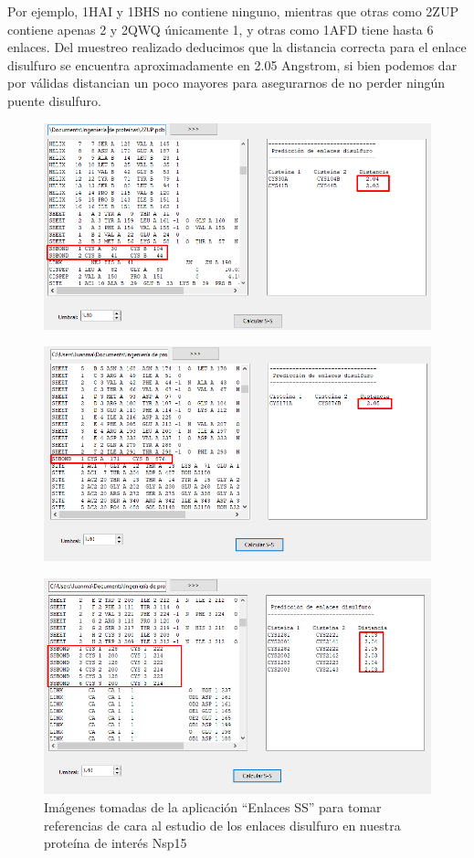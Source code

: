 \documentclass[12pt]{article}
\begin{document}
Por ejemplo, 1HAI y 1BHS no contiene ninguno, mientras que otras como 2ZUP contiene apenas 2 y 2QWQ únicamente 1, y otras como 1AFD tiene hasta 6 enlaces. Del muestreo realizado deducimos que la distancia correcta para el enlace disulfuro se encuentra aproximadamente en 2.05 Angstrom, si bien podemos dar por válidas distancian un poco mayores para asegurarnos de no perder ningún puente disulfuro.

\begin{figure}[H]
\centering
\includegraphics[scale=0.5]{Screenshot_38}
\end{figure}
\begin{figure}[H]
\centering
\includegraphics[scale=0.5]{Screenshot_39}
\end{figure}
\begin{figure}[H]
\centering
\includegraphics[scale=0.5]{Screenshot_40}
\caption{Imágenes tomadas de la aplicación ``Enlaces SS'' para tomar referencias de cara al estudio de los enlaces disulfuro en nuestra proteína de interés Nsp15}
\end{figure}
\end{document}
